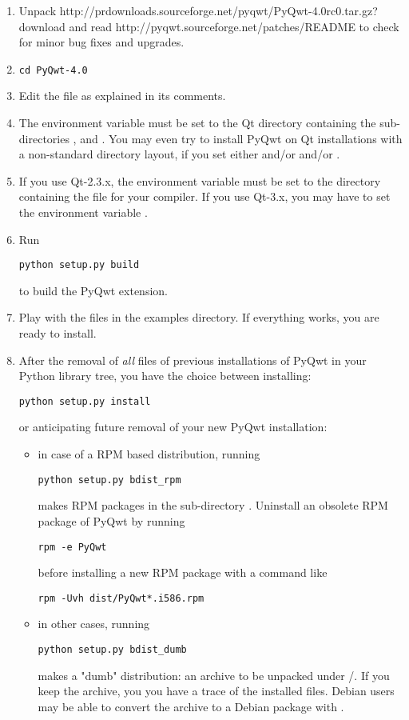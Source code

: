 \documentclass{manual}
\newcommand{\PyQwtTarGz}{\ulink{PyQwt-4.0rc0.tar.gz}
  {http://prdownloads.sourceforge.net/pyqwt/PyQwt-4.0rc0.tar.gz?download}}
\newcommand{\ReadMePatches}{\ulink{README}
  {http://pyqwt.sourceforge.net/patches/README}}
\begin{document}
\begin{enumerate}
\item
  Unpack \PyQwtTarGz{} and read \ReadMePatches{} to check for minor bug fixes
  and upgrades.
\item
  \begin{verbatim}
cd PyQwt-4.0
  \end{verbatim}
  {}
\item
  Edit the file  as explained in its comments.
  
\item
  The environment variable  must be set to the Qt directory
  containing the sub-directories ,  and .
  You may even try to install PyQwt on Qt installations with a non-standard
  directory layout, if you set either  and/or
   and/or .
\item
  If you use Qt-2.3.x, the environment variable  must be set
  to the directory containing the file  for your compiler.
  If you use Qt-3.x, you may have to set the environment variable
  .
\item
  Run
  \begin{verbatim}
python setup.py build
  \end{verbatim}
  to build the PyQwt extension.
\item
  Play with the  files in the examples directory.
  If everything works, you are ready to install.
\item
  After the removal of \emph{all} files of previous installations of PyQwt
  in your Python library tree, you have the choice between installing:
  \begin{verbatim}
python setup.py install
  \end{verbatim}
  or anticipating future removal of your new PyQwt installation:
  \begin{itemize}
  \item
    in case of a RPM based distribution, running
\begin{verbatim}
python setup.py bdist_rpm
\end{verbatim}
    makes RPM packages in the sub-directory .
    Uninstall an obsolete RPM package of PyQwt by running
    \begin{verbatim}
rpm -e PyQwt
    \end{verbatim}
    before installing a new RPM package with a command like
    \begin{verbatim}
rpm -Uvh dist/PyQwt*.i586.rpm
    \end{verbatim}
    {}
  \item
    in other cases, running
    \begin{verbatim}
python setup.py bdist_dumb
    \end{verbatim}
    makes a "dumb" distribution: an archive to be unpacked under /.
    If you keep the archive, you you have a trace of the installed files.
    Debian users may be able to convert the archive to a Debian package
    with .
  \end{itemize}
\end{enumerate}
\end{document}
